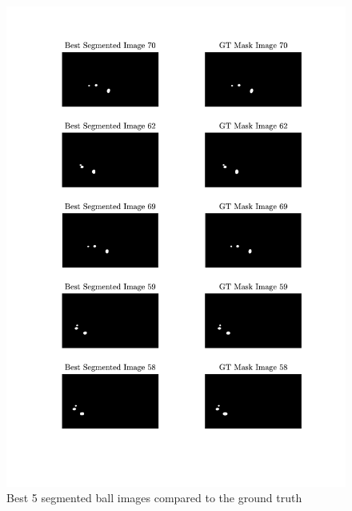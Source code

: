 \documentclass[conference]{IEEEtran}
\begin{document}
\begin{figure}[htbp]
    \centering
    \includegraphics[width=\columnwidth]{figures/best.pdf}
    \caption{Best 5 segmented ball images compared to the ground truth\label{apx:best}}
\end{figure}
\end{document}
